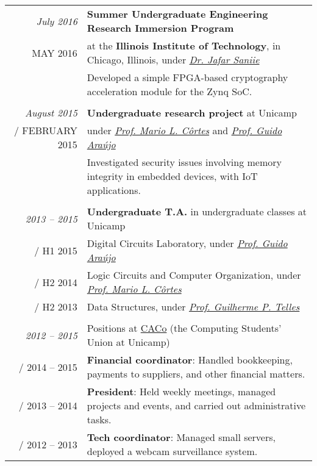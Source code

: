 \documentclass[a4paper,10pt]{article}
\makeatletter
\def\fakesc#1{%
  \begingroup%
  \xdef\fake@name{\csname\curr@fontshape/\f@size\endcsname}%
  \fontsize{\fontdimen8\fake@name}{\baselineskip}\selectfont%
  \uppercase{#1}%
  \endgroup%
}
\renewcommand{\textsc}{\fakesc}
\makeatother
\begin{document}
\begin{tabularx}{\textwidth}{r|X}

  \emph{July 2016} & \textbf{Summer Undergraduate Engineering Research Immersion Program}\\
 \textsc{May 2016}  & at the \textbf{Illinois Institute of Technology}, in Chicago, Illinois, under \href{https://engineering.iit.edu/faculty/jafar-saniie}{\emph{Dr. Jafar Saniie}}\\
                     &{\footnotesize Developed a simple FPGA-based cryptography acceleration module for the Zynq SoC.}\\
  \multicolumn{2}{c}{} \\


  \emph{August 2015} & \textbf{Undergraduate research project} at Unicamp\\
  \textsc{February 2015} & under \href{http://www.ic.unicamp.br/~cortes/}{\emph{Prof. Mario L. Côrtes}} and \href{http://guidoaraujo.wordpress.com/}{\emph{Prof. Guido Araújo}}\\
                     & {\footnotesize Investigated security issues involving memory integrity in embedded devices, with IoT applications.}\\
  \multicolumn{2}{c}{} \\

  \emph{2013 -- 2015} & \textbf{Undergraduate T.A.} in undergraduate classes at Unicamp \\
  \textsc{H1 2015} & {\footnotesize Digital Circuits Laboratory, under \href{http://guidoaraujo.wordpress.com/}{\emph{Prof. Guido Araújo}}}\\
  \textsc{H2 2014} & {\footnotesize Logic Circuits and Computer Organization, under \href{http://www.ic.unicamp.br/~cortes/}{\emph{Prof. Mario L. Côrtes}}}\\
  \textsc{H2 2013} & {\footnotesize Data Structures, under \href{http://ic.unicamp.br/~gpt/}{\emph{Prof. Guilherme P. Telles}}}\\
  \multicolumn{2}{c}{}\\

  \emph{2012 -- 2015} & Positions at \href{http://www.caco.ic.unicamp.br}{CACo} \footnotesize{(the Computing Students' Union at Unicamp)} \\
  \textsc{2014 -- 2015} & {\footnotesize \textbf{Financial coordinator}: Handled bookkeeping, payments to suppliers, and other financial matters.}\\
  \textsc{2013 -- 2014} & {\footnotesize \textbf{President}: Held weekly meetings, managed projects and events, and carried out administrative tasks.}\\
  \textsc{2012 -- 2013} & {\footnotesize \textbf{Tech coordinator}: Managed small servers, deployed a webcam surveillance system.}\\

\end{tabularx}
\end{document}
